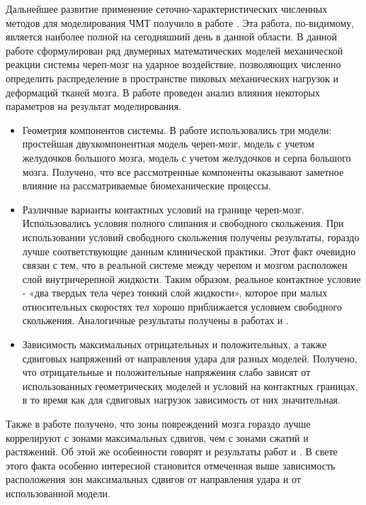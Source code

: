 Дальнейшее развитие применение сеточно-характеристических численных методов для моделирования ЧМТ получило в работе \cite{agapov_diser}. Эта работа, по-видимому, является наиболее полной на сегодняшний день в данной области. В данной работе сформулирован ряд двумерных математических моделей механической реакции системы череп-мозг на ударное воздействие, позволяющих численно определить распределение в пространстве пиковых механических нагрузок и деформаций тканей мозга. В работе проведен анализ влияния некоторых параметров на результат моделирования.

\begin{itemize}

\item Геометрия компонентов системы. В работе использовались три модели: простейшая двухкомпонентная модель череп-мозг, модель с учетом желудочков большого мозга, модель с учетом желудочков и серпа большого мозга. Получено, что все рассмотренные компоненты оказывают заметное влияние на рассматриваемые биомеханические процессы.

\item Различные варианты контактных условий на границе череп-мозг. Использовались условия полного слипания и свободного скольжения. При использовании условий свободного скольжения получены результаты, гораздо лучше соответствующие данным клинической практики. Этот факт очевидно связан с тем, что в реальной системе между черепом и мозгом расположен слой внутричерепной жидкости. Таким образом, реальное контактное условие - «два твердых тела через тонкий слой жидкости», которое при малых относительных скоростях тел хорошо приближается условием свободного скольжения. Аналогичные результаты получены в работах \cite{kuijpers} и \cite{claessens}.

\item Зависимость максимальных отрицательных и положительных, а также сдвиговых напряжений от направления удара для разных моделей. Получено, что отрицательные и положительные напряжения слабо зависят от использованных геометрических моделей и условий на контактных границах, в то время как для сдвиговых нагрузок зависимость от них значительная.

\end{itemize}

Также в работе \cite{agapov_diser} получено, что зоны повреждений мозга гораздо лучше коррелируют с зонами максимальных сдвигов, чем с зонами сжатий и растяжений. Об этой же особенности говорят и результаты работ \cite{zhou} и \cite{chu}. В свете этого факта особенно интересной становится отмеченная выше зависимость расположения зон максимальных сдвигов от направления удара и от использованной модели.


